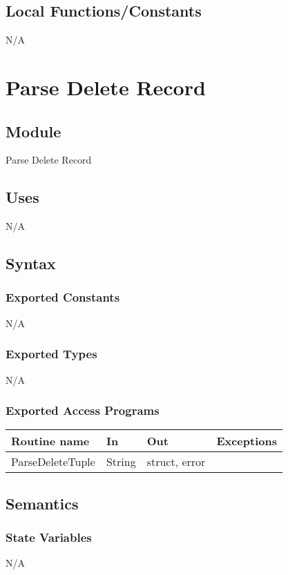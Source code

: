 \documentclass[12pt]{article}
\begin{document}
\subsection{Local Functions/Constants}
N/A
\medskip


\newpage

\section{Parse Delete Record}

\subsection{Module}
Parse Delete Record

\subsection {Uses}
N/A

\subsection {Syntax}

\subsubsection {Exported Constants}
N/A
\subsubsection {Exported Types}
N/A

\subsubsection {Exported Access Programs}

\begin{tabular}{| l | l | l | l |}
\hline
\textbf{Routine name} & \textbf{In} & \textbf{Out} & \textbf{Exceptions}\\
\hline
{\color{red}ParseDeleteTuple} & {\color{red}String} & {\color{red}struct, error} & \\
\hline
\end{tabular}

\subsection{Semantics}
\subsubsection{State Variables}
N/A
\end{document}
